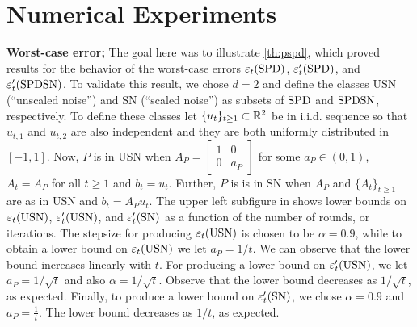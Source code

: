 \section{Numerical Experiments}\label{sec:exp}

\textbf{Worst-case error;}
The goal here was to illustrate \cref{th:pspd}, which 
proved results for the behavior
of the worst-case errors $\varepsilon_t(\mathrm{SPD})$, $\varepsilon_t'(\mathrm{SPD})$, and $\varepsilon_t'(\mathrm{SPDSN})$.
To validate this result, we chose $d=2$ and define the classes $\text{USN}$ (``unscaled noise'') and $\text{SN}$ (``scaled noise'') as subsets of $\mathrm{SPD}$ and $\mathrm{SPDSN}$, respectively. 
To define these classes let $\{u_t\}_{t\ge 1}\subset \mathbb{R}^2$ be in i.i.d. sequence so that $u_{t,1}$ and $u_{t,2}$ are also independent and they are both uniformly distributed in $[-1,1]$.
Now, $P$ is in $\text{USN}$ when $A_P=\left[\begin{matrix}1 &0\\ 0 & a_P\end{matrix}\right]$ for some $a_P\in (0,1)$,
$A_t = A_P$ for all $t\ge 1$ and $b_t = u_t$.
Further, $P$ is is in $\text{SN}$ when $A_P$ and $\{A_t\}_{t\ge 1}$ are as in $\text{USN}$ and $b_t = A_P u_t$.
The upper left subfigure in  shows lower bounds on $\varepsilon_t(\text{USN})$, $\varepsilon_t'(\text{USN})$, 
and $\varepsilon_t'(\text{SN})$ as a function of the number of rounds, or iterations.
The stepsize for producing $\varepsilon_t(\text{USN})$ is chosen to be $\alpha = 0.9$, while to obtain a lower bound on $\varepsilon_t(\text{USN})$ we let $a_P=1/t$. We can observe that the lower bound increases linearly with $t$.
For producing a lower bound on $\varepsilon_t'(\text{USN})$, we let $a_P = 1/\sqrt{t}$ and also $\alpha = 1/\sqrt{t}$.
Observe that the lower bound decreases as $1/\sqrt{t}$, as expected.
Finally, to produce a lower bound on $\varepsilon_t'(\text{SN})$, we chose $\alpha = 0.9$ and $a_P = \frac{1}{t}$. 
The lower bound decreases as $1/t$, as expected.

